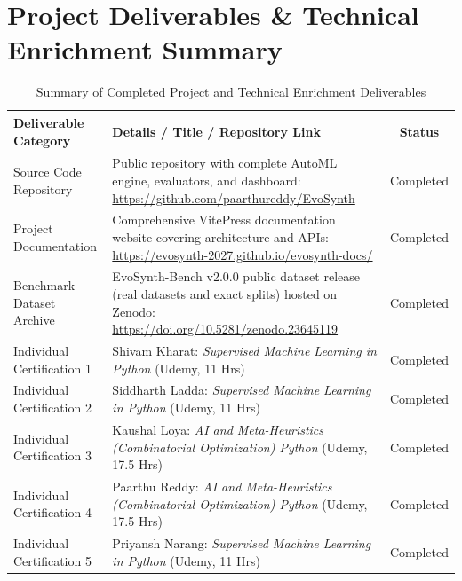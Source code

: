 \documentclass[11pt, a4paper]{article}
\begin{document}
\section{Project Deliverables \& Technical Enrichment Summary}
\begin{table}[H]
    \centering
    \footnotesize
    \renewcommand{\arraystretch}{1.2}
    \begin{tabular}{|p{4.2cm}|p{8.0cm}|c|}
        \hline
        \textbf{Deliverable Category} & \textbf{Details / Title / Repository Link} & \textbf{Status} \\
        \hline
        Source Code Repository & Public repository with complete AutoML engine, evaluators, and dashboard: \newline \url{https://github.com/paarthureddy/EvoSynth} & Completed \\
        \hline
        Project Documentation & Comprehensive VitePress documentation website covering architecture and APIs: \newline \url{https://evosynth-2027.github.io/evosynth-docs/} & Completed \\
        \hline
        Benchmark Dataset Archive & EvoSynth-Bench v2.0.0 public dataset release (real datasets and exact splits) hosted on Zenodo: \newline \url{https://doi.org/10.5281/zenodo.23645119} & Completed \\
        \hline
        Individual Certification 1 & Shivam Kharat: \textit{Supervised Machine Learning in Python} (Udemy, 11 Hrs) & Completed \\
        \hline
        Individual Certification 2 & Siddharth Ladda: \textit{Supervised Machine Learning in Python} (Udemy, 11 Hrs) & Completed \\
        \hline
        Individual Certification 3 & Kaushal Loya: \textit{AI and Meta-Heuristics (Combinatorial Optimization) Python} (Udemy, 17.5 Hrs) & Completed \\
        \hline
        Individual Certification 4 & Paarthu Reddy: \textit{AI and Meta-Heuristics (Combinatorial Optimization) Python} (Udemy, 17.5 Hrs) & Completed \\
        \hline
        Individual Certification 5 & Priyansh Narang: \textit{Supervised Machine Learning in Python} (Udemy, 11 Hrs) & Completed \\
        \hline
    \end{tabular}
    \caption{Summary of Completed Project and Technical Enrichment Deliverables}
\end{table}
\end{document}
